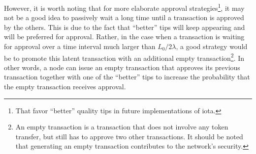 \documentclass[12pt]{article}
\begin{document}
\begin{CJK}{UTF8}{bkai}
However, 
it is worth noting that for more elaborate
approval strategies\footnote{That favor 
``better'' quality tips in future implementations of iota.}, it may not be a good
idea to passively wait a long time until a transaction
is approved by the others. 
This is 
due to the fact that ``better'' tips will
keep appearing and will be preferred for approval.
Rather, in the case when a transaction is waiting 
for approval over 
a time interval much larger than $L_0/2\lambda$,
a good strategy 
would be 
to promote this latent transaction with an additional empty 
transaction\footnote{An empty transaction is a transaction
that does not involve any token transfer, but still has to
approve two other transactions. It should be noted that 
generating an 
empty transaction contributes 
to the network's security.}. 
In other words, a node can issue an empty transaction that 
approves its previous transaction together with one of the ``better'' tips to 
increase the probability that the empty transaction receives approval.


\end{CJK}
\end{document}
